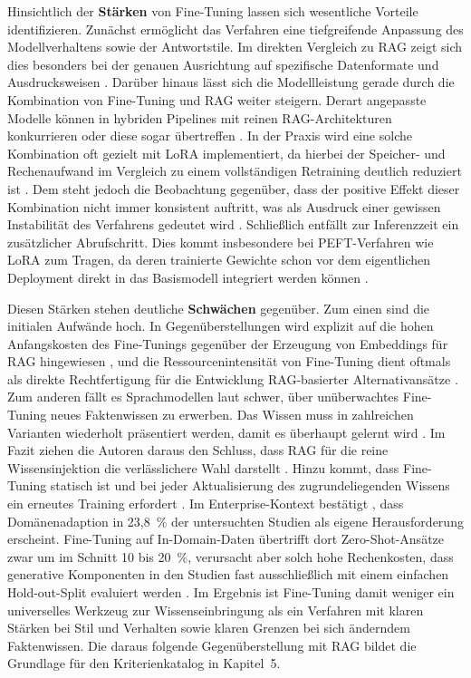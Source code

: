 Hinsichtlich der \textbf{Stärken} von Fine-Tuning lassen sich wesentliche Vorteile identifizieren. Zunächst ermöglicht das Verfahren eine tiefgreifende Anpassung des Modellverhaltens sowie der Antwortstile. Im direkten Vergleich zu RAG zeigt sich dies besonders bei der genauen Ausrichtung auf spezifische Datenformate und Ausdrucksweisen \autocite[5, 10]{Gao.2024}.
Darüber hinaus lässt sich die Modellleistung gerade durch die Kombination von Fine-Tuning und RAG weiter steigern. Derart angepasste Modelle können in hybriden Pipelines mit reinen RAG-Architekturen konkurrieren oder diese sogar übertreffen \autocite[2]{Soudani.2024}.
In der Praxis wird eine solche Kombination oft gezielt mit LoRA implementiert, da hierbei der Speicher- und Rechenaufwand im Vergleich zu einem vollständigen Retraining deutlich reduziert ist \autocite[10]{Balaguer.2024}.
Dem steht jedoch die Beobachtung gegenüber, dass der positive Effekt dieser Kombination nicht immer konsistent auftritt, was als Ausdruck einer gewissen Instabilität des Verfahrens gedeutet wird \autocite[7]{Ovadia.2024}. 
Schließlich entfällt zur Inferenzzeit ein zusätzlicher Abrufschritt. Dies kommt insbesondere bei PEFT-Verfahren wie LoRA zum Tragen, da deren trainierte Gewichte schon vor dem eigentlichen Deployment direkt in das Basismodell integriert werden können \autocite[4]{Hu.2022}.

Diesen Stärken stehen deutliche \textbf{Schwächen} gegenüber. Zum einen sind die initialen Aufwände hoch. In Gegenüberstellungen wird explizit auf die hohen Anfangskosten des Fine-Tunings gegenüber der Erzeugung von Embeddings für RAG hingewiesen \autocite[29]{Balaguer.2024},
und die Ressourcenintensität von Fine-Tuning dient oftmals als direkte Rechtfertigung für die Entwicklung RAG-basierter Alternativansätze \autocite[1f.]{Soudani.2024}.
Zum anderen fällt es Sprachmodellen laut \textcite[1]{Ovadia.2024} schwer, über unüberwachtes Fine-Tuning neues Faktenwissen zu erwerben. Das Wissen muss in zahlreichen Varianten wiederholt präsentiert werden, damit es überhaupt gelernt wird \autocite[8]{Ovadia.2024}.
Im Fazit ziehen die Autoren daraus den Schluss, dass RAG für die reine Wissensinjektion die verlässlichere Wahl darstellt \autocite[8]{Ovadia.2024}.
Hinzu kommt, dass Fine-Tuning statisch ist und bei jeder Aktualisierung des zugrundeliegenden Wissens ein erneutes Training erfordert \autocite[5]{Gao.2024}.
Im Enterprise-Kontext bestätigt \textcite[17]{Karakurt.2026}, dass Domänenadaption in 23{,}8~\% der untersuchten Studien als eigene Herausforderung erscheint.
Fine-Tuning auf In-Domain-Daten übertrifft dort Zero-Shot-Ansätze zwar um im Schnitt 10 bis 20~\%, verursacht aber solch hohe Rechenkosten, dass generative Komponenten in den Studien fast ausschließlich mit einem einfachen Hold-out-Split evaluiert werden \autocite[14]{Karakurt.2026}. 
Im Ergebnis ist Fine-Tuning damit weniger ein universelles Werkzeug zur Wissenseinbringung als ein Verfahren mit klaren Stärken bei Stil und Verhalten sowie klaren Grenzen bei sich änderndem Faktenwissen. Die daraus folgende Gegenüberstellung mit RAG bildet die Grundlage für den Kriterienkatalog in Kapitel~5.
